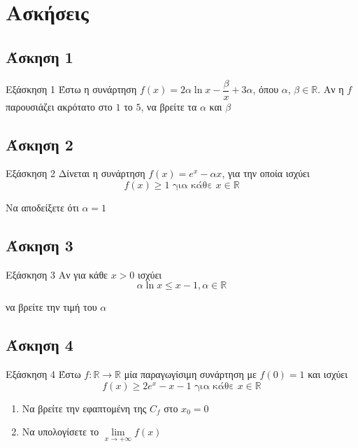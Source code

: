 \documentclass[greek]{beamer}
\begin{document}
\section{Ασκήσεις}
\subsection{Άσκηση 1}
\begin{frame}[label=Άσκηση1,t]{Εξάσκηση 1}
 Έστω η συνάρτηση $f(x)=2α\ln x-\dfrac{β}{x}+3α$, όπου $α$, $β\in\mathbb{R}$. Αν η $f$ παρουσιάζει ακρότατο στο $1$ το $5$, να βρείτε τα $α$ και $β$

\end{frame}

\subsection{Άσκηση 2}
\begin{frame}[label=Άσκηση2,t]{Εξάσκηση 2}
 Δίνεται η συνάρτηση $f(x)=e^x-αx$, για την οποία ισχύει
 $$f(x)\ge 1 \text{ για κάθε } x\in\mathbb{R}$$

 Να αποδείξετε ότι $α=1$

\end{frame}

\subsection{Άσκηση 3}
\begin{frame}[label=Άσκηση3,t]{Εξάσκηση 3}
 Αν για κάθε $x>0$ ισχύει
 $$α\ln x\le x-1,α\in\mathbb{R}$$

 να βρείτε την τιμή του $α$

\end{frame}

\subsection{Άσκηση 4}
\begin{frame}[label=Άσκηση4,t]{Εξάσκηση 4}
 Έστω $f:\mathbb{R}\to\mathbb{R}$ μία παραγωγίσιμη συνάρτηση με $f(0)=1$ και ισχύει
 $$f(x)\ge 2e^x-x-1 \text{ για κάθε } x\in\mathbb{R}$$
 \begin{enumerate}
  \item<1-> Να βρείτε την εφαπτομένη της $C_f$ στο $x_0=0$
  \item<2-> Να υπολογίσετε το $\lim\limits_{x \to +\infty}{ f(x) }$
 \end{enumerate}

\end{frame}
\end{document}
